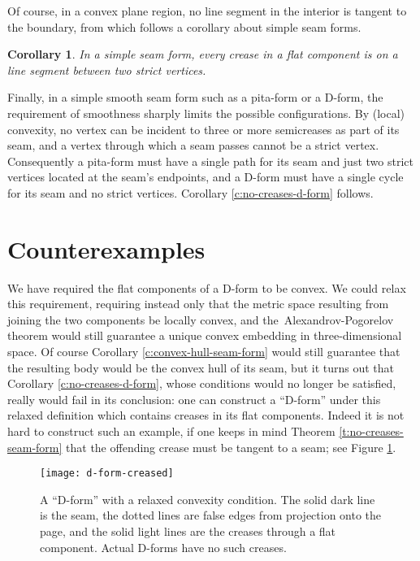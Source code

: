 \documentclass{article}
\newtheorem{corollary}[theorem]{Corollary}
\begin{document}
Of course, in a convex plane region, no line segment in the interior is
tangent to the boundary, from which follows a corollary about simple
seam forms.

\begin{corollary}\label{c:no-creases-doubly-convex}
  In a simple seam form, every crease in a flat component
  is on a line segment between two strict vertices.
\end{corollary}

Finally, in a simple smooth seam form such as a pita-form or a D-form,
the requirement of smoothness sharply limits the possible
configurations.  By (local) convexity, no vertex can be incident to three or
more semicreases as part of its seam, and a vertex through which a seam
passes cannot be a strict vertex.  Consequently a pita-form must have
a single path for its seam and just two strict vertices located at the
seam's endpoints, and a D-form must have a single cycle for its seam
and no strict vertices.  Corollary \ref{c:no-creases-d-form} follows.



\section{Counterexamples}
\label{sec:counterexamples}

We have required the flat components of a D-form to be convex.  We
could relax this
requirement, requiring instead only that the metric space resulting
from joining the two components be locally convex, and
the~Alexandrov-Pogorelov theorem would still guarantee a unique convex
embedding in three-dimensional space.  Of course Corollary
\ref{c:convex-hull-seam-form} would still guarantee that the resulting
body would be the convex hull of its seam, but it turns out that
Corollary \ref{c:no-creases-d-form}, whose conditions would no longer
be satisfied, really would fail in its conclusion: one can construct a
``D-form'' under this relaxed definition which contains creases in its
flat components.  Indeed it is not hard to construct such an example, if
one keeps in mind Theorem \ref{t:no-creases-seam-form} that the
offending crease must be tangent to a seam; see Figure
\ref{f:d-form-creased}.

\begin{figure}[tbh]
  \centering
  \texttt{[image: d-form-creased]}
  \caption{A ``D-form'' with a relaxed convexity condition.  The 
    solid dark line is the seam, the dotted lines are false edges from
    projection onto the page, and the solid light lines are the
    creases through a flat component.  Actual D-forms have no such
    creases.}
  \label{f:d-form-creased}
\end{figure}
\end{document}
